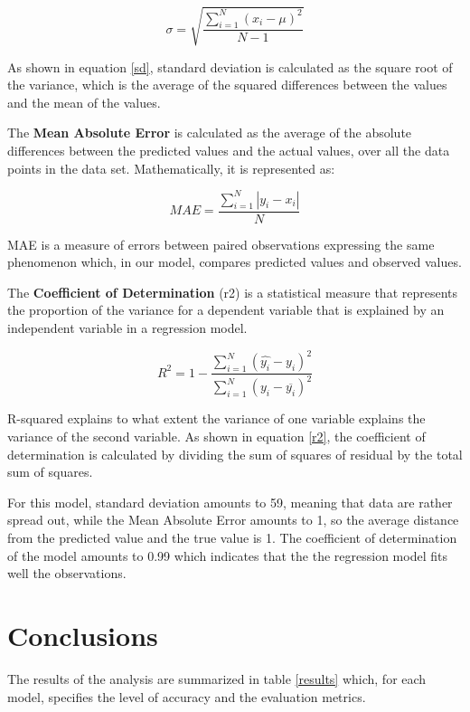\documentclass[conference,compsoc]{IEEEtran}
\begin{document}
\begin{equation} \label{sd}
    \sigma = \sqrt{\frac{\sum_{{i = 1}}^{N}(x_{i} - \mu)^2}{N - 1}}
\end{equation}

As shown in equation \ref{sd}, standard deviation is calculated as the square root of the variance, which is the average of the squared differences between the values and the mean of the values.

The \textbf{Mean Absolute Error} is calculated as the average of the absolute differences between the predicted values and the actual values, over all the data points in the data set. 
%
Mathematically, it is represented as:

\begin{equation} \label{mae}
    MAE = \frac{\sum_{i = 1}^{N}\left| y_{i} - x_{i} \right|}{N}
\end{equation}

MAE is a measure of errors between paired observations expressing the same phenomenon which, in our model, compares predicted values and observed values.

The \textbf{Coefficient of Determination} (r2) is a statistical measure that represents the proportion of the variance for a dependent variable that is explained by an independent variable in a regression model. 

\begin{equation} \label{r2}
    R^2 = 1 - \frac{\sum_{i = 1}^{N}(\widehat{y_{i}} - y_{i})^2}{\sum_{i = 1}^{N}(y_{i} - \overline{y_{i}})^2}
\end{equation}

R-squared explains to what extent the variance of one variable explains the variance of the second variable. 
%
As shown in equation \ref{r2}, the coefficient of determination is calculated by dividing the sum of squares of residual by the total sum of squares.

For this model, standard deviation amounts to 59, meaning that data are rather spread out, while the Mean Absolute Error amounts to 1, so the average distance from the predicted value and the true value is 1. 
%
The coefficient of determination of the model amounts to 0.99 which indicates that the the regression model fits well the observations. 

\section{Conclusions}
The results of the analysis are summarized in table \ref{results} which, for each model, specifies the level of accuracy and the evaluation metrics.
\end{document}
